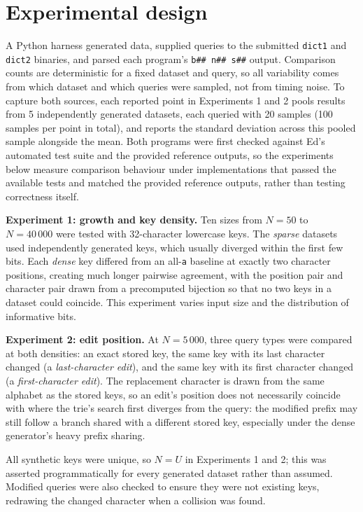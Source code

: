 \documentclass[10pt]{article}
\begin{document}
\section{Experimental design}

A Python harness generated data, supplied queries to the submitted \texttt{dict1} and
\texttt{dict2} binaries, and parsed each program's \texttt{b\#\# n\#\# s\#\#} output.
Comparison counts are deterministic for a fixed dataset and query, so all variability
comes from which dataset and which queries were sampled, not from timing noise. To
capture both sources, each reported point in Experiments 1 and 2 pools results from 5
independently generated datasets, each queried with 20 samples (100 samples per point in
total), and reports the standard deviation across this pooled sample alongside the mean.
Both programs were first checked against Ed's automated test suite and the provided
reference outputs, so the experiments below measure comparison behaviour under
implementations that passed the available tests and matched the provided reference
outputs, rather than testing correctness itself.

\textbf{Experiment 1: growth and key density.}
Ten sizes from $N=50$ to $N=40\,000$ were tested with 32-character lowercase keys.
The \emph{sparse} datasets used independently generated keys, which usually diverged
within the first few bits. Each \emph{dense} key differed from an all-\texttt{a} baseline
at exactly two character positions, creating much longer pairwise agreement, with the
position pair and character pair drawn from a precomputed bijection so that no two keys
in a dataset could coincide. This experiment varies input size and the distribution of
informative bits.

\textbf{Experiment 2: edit position.}
At $N=5\,000$, three query types were compared at both densities: an exact stored key,
the same key with its last character changed (a \emph{last-character edit}), and the same
key with its first character changed (a \emph{first-character edit}). The replacement
character is drawn from the same alphabet as the stored keys, so an edit's position does
not necessarily coincide with where the trie's search first diverges from the query: the
modified prefix may still follow a branch shared with a different stored key, especially
under the dense generator's heavy prefix sharing.

All synthetic keys were unique, so $N=U$ in Experiments 1 and 2; this was asserted
programmatically for every generated dataset rather than assumed. Modified queries were
also checked to ensure they were not existing keys, redrawing the changed character when
a collision was found.
\end{document}
